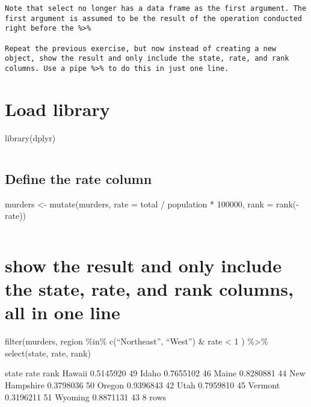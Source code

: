 \documentclass[
]{article}
\begin{document}
\begin{verbatim}
Note that select no longer has a data frame as the first argument. The first argument is assumed to be the result of the operation conducted right before the %>%

Repeat the previous exercise, but now instead of creating a new object, show the result and only include the state, rate, and rank columns. Use a pipe %>% to do this in just one line.
\end{verbatim}

\hypertarget{load-library}{%
\section{Load library}\label{load-library}}

library(dplyr)

\begin{verbatim}
\end{verbatim}

\hypertarget{define-the-rate-column}{%
\subsection{Define the rate column}\label{define-the-rate-column}}

murders \textless- mutate(murders, rate = total / population * 100000,
rank = rank(-rate))

\begin{verbatim}
\end{verbatim}

\hypertarget{show-the-result-and-only-include-the-state-rate-and-rank-columns-all-in-one-line}{%
\section{show the result and only include the state, rate, and rank
columns, all in one
line}\label{show-the-result-and-only-include-the-state-rate-and-rank-columns-all-in-one-line}}

filter(murders, region \%in\% c(``Northeast'', ``West'') \& rate
\textless{} 1 ) \%\textgreater\% select(state, rate, rank)

state rate rank Hawaii 0.5145920 49 Idaho 0.7655102 46 Maine 0.8280881
44 New Hampshire 0.3798036 50 Oregon 0.9396843 42 Utah 0.7959810 45
Vermont 0.3196211 51 Wyoming 0.8871131 43 8 rows
\end{document}
